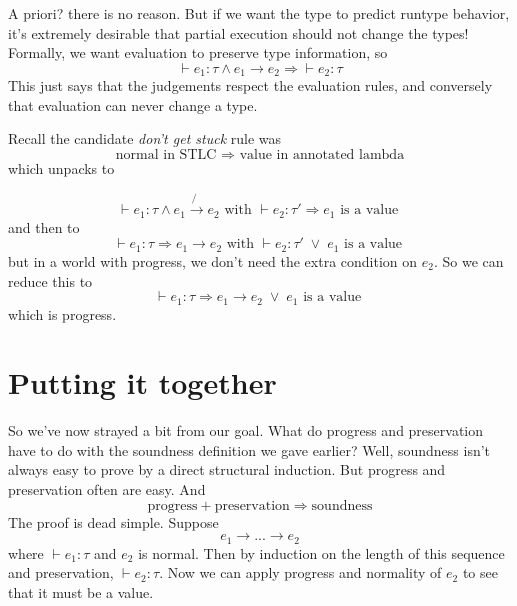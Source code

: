 \documentclass[12pt]{article}
\begin{document}
A priori? there is no reason.
But if we want the type to predict runtype behavior, it's extremely desirable that partial execution should not change the types!
Formally, we want evaluation to preserve type information, so 
\[
  \vdash e_1 : \tau \land e_1 \rightarrow e_2 \Rightarrow \vdash e_2 : \tau
\]
This just says that the judgements respect the evaluation rules, and conversely that evaluation can never change a type.

Recall the candidate \textit{don't get stuck} rule was
\[
  \text{ normal in STLC } \Rightarrow \text{ value in annotated lambda }
\]
which unpacks to 

\[
  \vdash e_1 : \tau \land e_1 \not{\rightarrow} e_2 \text{ with } \vdash e_2 : \tau'  \Longrightarrow e_1 \text{ is a value }
\]
and then to
\[
  \vdash e_1 : \tau \Longrightarrow e_1 \rightarrow e_2 \text{ with } \vdash e_2 : \tau' \; \lor \; e_1 \text{ is a value }
\]
but in a world with progress, we don't need the extra condition on $e_2$.
So we can reduce this to
\[
  \vdash e_1 : \tau \Longrightarrow e_1 \rightarrow e_2 \; \lor \; e_1 \text{ is a value }
\]
which is progress.
\section{Putting it together}
So we've now strayed a bit from our goal.
What do progress and preservation have to do with the soundness definition we gave earlier?
Well, soundness isn't always easy to prove by a direct structural induction.
But progress and preservation often are easy.
And 
\[
 \text{progress} + \text{preservation} \Rightarrow \text{soundness}
\]
The proof is dead simple. Suppose 
\[
 e_1 \rightarrow ... \rightarrow e_2
\]
where $\vdash e_1 : \tau$ and $e_2$ is normal.
Then by induction on the length of this sequence and preservation, $\vdash e_2 : \tau$.
Now we can apply progress and normality of $e_2$ to see that it must be a value.
\end{document}
